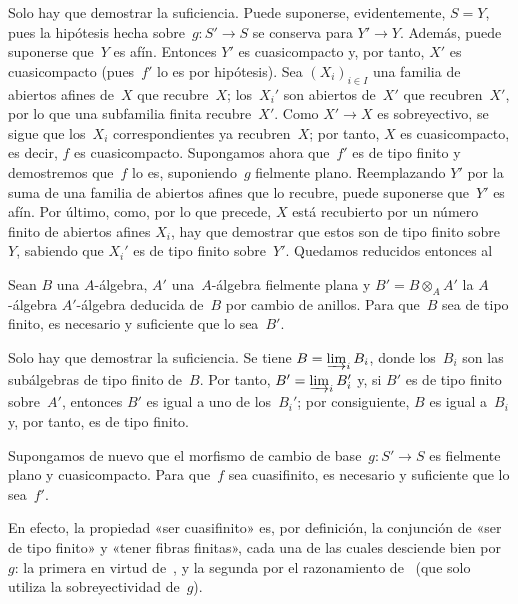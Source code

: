 Solo hay que demostrar la suficiencia. Puede suponerse, evidentemente,
$S=Y$, pues la hipótesis hecha sobre~$g\colon S'\to S$ se conserva para
$Y'\to Y$. Además, puede suponerse que~$Y$ es afín. Entonces $Y'$ es
cuasicompacto y, por tanto, $X'$ es cuasicompacto (pues~$f'$ lo es por
hipótesis). Sea $(X_{i})_{i\in I}$ una familia de abiertos afines de~$X$ que
recubre~$X$; los~$X_{i}'$ son abiertos de~$X'$ que recubren~$X'$, por lo que
una subfamilia finita recubre~$X'$. Como $X'\to X$ es sobreyectivo, se sigue
que los~$X_{i}$ correspondientes ya recubren~$X$; por tanto, $X$ es
cuasicompacto, es decir, $f$ es cuasicompacto. Supongamos ahora que~$f'$ es
de tipo finito y demostremos que~$f$ lo es, suponiendo~$g$ fielmente plano.
Reemplazando $Y'$ por la suma de una familia de abiertos afines que lo
recubre, puede suponerse que~$Y'$ es afín. Por último, como, por lo que
precede, $X$ está recubierto por un número finito de abiertos afines
$X_{i}$, hay que demostrar que estos son de tipo finito sobre~$Y$, sabiendo
que $X_{i}'$ es de tipo finito sobre~$Y'$. Quedamos reducidos entonces al

\begin{corollaire}
\label{VIII.3.4}
Sean $B$ una $A$-álgebra, $A'$ una~$A$-álgebra fielmente plana y
$B'=B\otimes_{A}A'$ la
{$A$-álgebra}
{$A'$-álgebra}
deducida de~$B$ por cambio de anillos. Para que~$B$ sea de tipo finito, es
necesario y suficiente que lo sea~$B'$.
\end{corollaire}

Solo hay que demostrar la suficiencia. Se tiene
$B=\varinjlim_i B_{i}$, donde los~$B_{i}$ son las subálgebras de tipo finito
de~$B$. Por tanto, $B'=\varinjlim_i B_{i}'$ y, si $B'$ es de tipo finito
sobre~$A'$, entonces $B'$ es igual a uno de los~$B_{i}'$; por consiguiente,
$B$ es igual a~$B_{i}$ y, por tanto, es de tipo finito.

\begin{corollaire}
\label{VIII.3.5}
Supongamos de nuevo que el morfismo de cambio de base~$g\colon S'\to S$ es
fielmente plano y cuasicompacto. Para que~$f$ sea cuasifinito, es necesario y
suficiente que lo sea~$f'$.
\end{corollaire}

En efecto, la propiedad «ser cuasifinito» es, por definición, la conjunción
de «ser de tipo finito» y «tener fibras finitas», cada una de las cuales
desciende bien por~$g$: la primera en virtud de~, y la segunda
por el razonamiento de~ (que solo utiliza la sobreyectividad
de~$g$).

